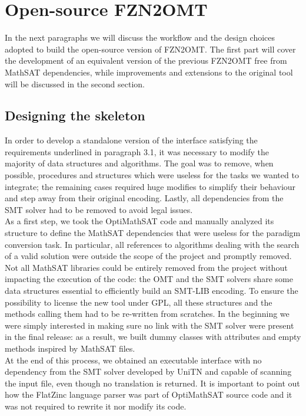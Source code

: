 \section{Open-source FZN2OMT}

In the next paragraphs we will discuss the workflow and the design choices adopted to build the open-source version of FZN2OMT. The first part will cover the development of an equivalent version of the previous FZN2OMT free from MathSAT dependencies, while improvements and extensions to the original tool will be discussed in the second section.

\subsection{Designing the skeleton}

In order to develop a standalone version of the interface satisfying the requirements underlined in paragraph 3.1, it was necessary to modify the majority of data structures and algorithms. The goal was to remove, when possible, procedures and structures which were useless for the tasks we wanted to integrate; the remaining cases required huge modifies to simplify their behaviour and step away from their original encoding. Lastly, all dependencies from the SMT solver had to be removed to avoid legal issues. \\
As a first step, we took the OptiMathSAT code and manually analyzed its structure to define the MathSAT dependencies that were useless for the paradigm conversion task. In particular, all references to algorithms dealing with the search of a valid solution were outside the scope of the project and promptly removed. Not all MathSAT libraries could be entirely removed from the project without impacting the execution of the code: the OMT and the SMT solvers share some data structures essential to efficiently build an SMT-LIB encoding. To ensure the possibility to license the new tool under GPL, all these structures and the methods calling them had to be re-written from scratches. In the beginning we were simply interested in making sure no link with the SMT solver were present in the final release: as a result, we built dummy classes with attributes and empty methods inspired by MathSAT files. \\
At the end of this process, we obtained an executable interface with no dependency from the SMT solver developed by UniTN and capable of scanning the input file, even though no translation is returned.
It is important to point out how the FlatZinc language parser was part of OptiMathSAT source code and it was not required to rewrite it nor modify its code.

